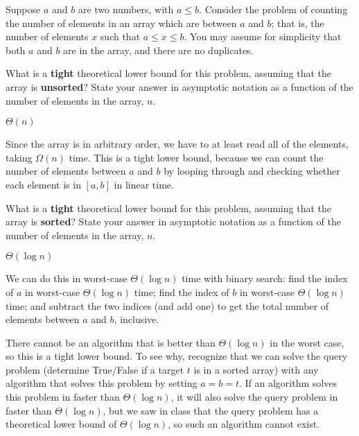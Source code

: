 
\begin{prob}[(2 points)]
    Suppose $a$ and $b$ are two numbers, with $a \leq b$.
    Consider the problem of counting the number of elements in an array which
    are between $a$ and $b$; that is, the number of elements $x$ such that $a
    \leq x \leq b$. You may assume for simplicity that both $a$ and $b$ are in the array,
    and there are no duplicates.

    \begin{subprobset}
        \begin{subprob}
            What is a \textbf{tight} theoretical lower bound for this problem, assuming that
            the array is \textbf{unsorted}? State your answer in asymptotic notation as a function
            of the number of elements in the array, $n$.

            \begin{soln}
                $\Theta(n)$

                Since the array is in arbitrary order, we have to at least read all
                of the elements, taking $\Omega(n)$ time. This is a tight lower bound,
                because we can count the number of elements between $a$ and $b$ by
                looping through and checking whether each element is in $[a, b]$
                in linear time.
            \end{soln}
        \end{subprob}

        \begin{subprob}
            What is a \textbf{tight} theoretical lower bound for this problem, assuming that
            the array is \textbf{sorted}? State your answer in asymptotic notation as a function
            of the number of elements in the array, $n$.

            \begin{soln}
                $\Theta(\log n)$

                We can do this in worst-case $\Theta(\log n)$ time with binary search:
                find the index of $a$ in worst-case $\Theta(\log n)$ time;
                find the index of $b$ in worst-case $\Theta(\log n)$ time;
                and subtract the two indices (and add one) to get the total number
                of elements between $a$ and $b$, inclusive.

                There cannot be an algorithm that is better than $\Theta(\log n)$
                in the worst case, so this is a tight lower bound. To see why, recognize
                that we can solve the query problem (determine True/False if a target $t$
                is in a sorted array) with any algorithm that solves this problem by
                setting $a = b = t$. If an algorithm solves this problem in faster than
                $\Theta(\log n)$, it will also solve the query problem in faster than
                $\Theta(\log n)$, but we saw in class that the query problem has a theoretical
                lower bound of $\Theta(\log n)$, so such an algorithm cannot exist.
            \end{soln}


\end{subprob}
\end{subprobset}
\end{prob}
